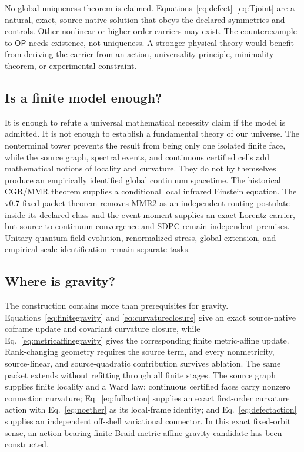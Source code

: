 \documentclass[11pt]{article}
\theoremstyle{definition}
\theoremstyle{remark}
\newcommand{\OPT}{\mathsf{OP}}
\begin{document}
No global uniqueness theorem is claimed. Equations~\eqref{eq:defect}--\eqref{eq:Tjoint} are a natural, exact, source-native solution that obeys the declared symmetries and controls. Other nonlinear or higher-order carriers may exist. The counterexample to $\OPT$ needs existence, not uniqueness. A stronger physical theory would benefit from deriving the carrier from an action, universality principle, minimality theorem, or experimental constraint.

\subsection{Is a finite model enough?}

It is enough to refute a universal mathematical necessity claim if the model is admitted. It is not enough to establish a fundamental theory of our universe. The nonterminal tower prevents the result from being only one isolated finite face, while the source graph, spectral events, and continuous certified cells add mathematical notions of locality and curvature. They do not by themselves produce an empirically identified global continuum spacetime. The historical CGR/MMR theorem supplies a conditional local infrared Einstein equation. The v0.7 fixed-packet theorem removes MMR2 as an independent routing postulate inside its declared class and the event moment supplies an exact Lorentz carrier, but source-to-continuum convergence and SDPC remain independent premises. Unitary quantum-field evolution, renormalized stress, global extension, and empirical scale identification remain separate tasks.

\subsection{Where is gravity?}

The construction contains more than prerequisites for gravity. Equations~\eqref{eq:finitegravity} and \eqref{eq:curvatureclosure} give an exact source-native coframe update and covariant curvature closure, while Eq.~\eqref{eq:metricaffinegravity} gives the corresponding finite metric-affine update. Rank-changing geometry requires the source term, and every nonmetricity, source-linear, and source-quadratic contribution survives ablation. The same packet extends without refitting through all finite stages. The source graph supplies finite locality and a Ward law; continuous certified faces carry nonzero connection curvature; Eq.~\eqref{eq:fullaction} supplies an exact first-order curvature action with Eq.~\eqref{eq:noether} as its local-frame identity; and Eq.~\eqref{eq:defectaction} supplies an independent off-shell variational connector. In this exact fixed-orbit sense, an action-bearing finite Braid metric-affine gravity candidate has been constructed.
\end{document}
